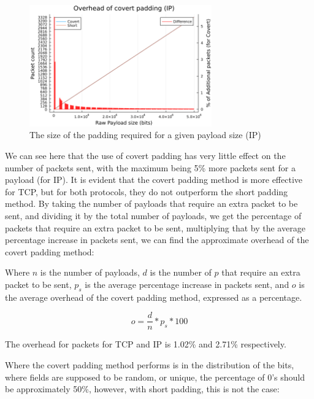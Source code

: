 \begin{figure}[h]
    \centering
    \includegraphics[width=0.7\textwidth]{fig/padding_size_IP.png}
    \caption{The size of the padding required for a given payload size (IP)}
    \label{fig:padding_size_IP}
\end{figure}

We can see here that the use of covert padding has very little effect on the number of packets sent, with the maximum being 5\% more packets sent for a payload (for IP). It is evident that the covert padding method is more effective for TCP, but for both protocols, they do not outperform the short padding method. By taking the number of payloads that require an extra packet to be sent, and dividing it by the total number of payloads, we get the percentage of packets that require an extra packet to be sent, multiplying that by the average percentage increase in packets sent, we can find the approximate overhead of the covert padding method:

Where $n$ is the number of payloads, $d$ is the number of $p$ that require an extra packet to be sent, $p_s$ is the average percentage increase in packets sent, and $o$ is the average overhead of the covert padding method, expressed as a percentage.

\begin{equation*}
    o = \frac{d}{n} * p_s * 100
\end{equation*}

The overhead for packets for TCP and IP is 1.02\% and 2.71\% respectively.

Where the covert padding method performs is in the distribution of the bits, where fields are supposed to be random, or unique, the percentage of 0's should be approximately 50\%, however, with short padding, this is not the case:

